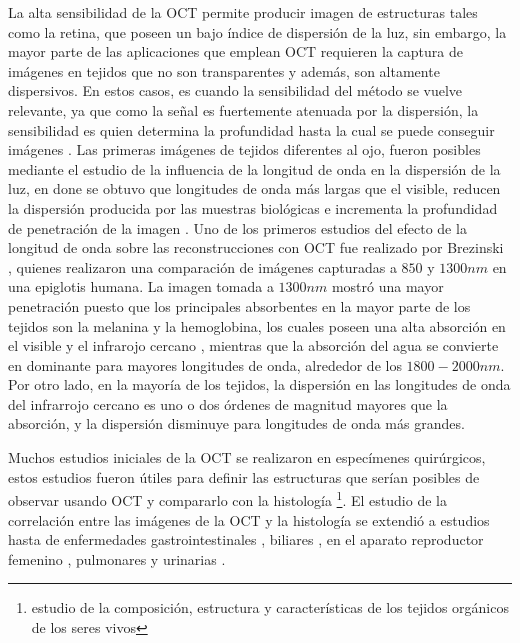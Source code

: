 La alta sensibilidad de la OCT permite producir imagen de estructuras tales como la retina, que poseen un bajo índice de dispersión de la luz, sin embargo, la mayor parte de las aplicaciones que emplean OCT requieren la captura de imágenes en tejidos que no son transparentes y además, son altamente dispersivos. En estos casos, es cuando la sensibilidad del método se vuelve relevante, ya que como la señal es fuertemente atenuada por la dispersión, la sensibilidad es quien determina la profundidad hasta la cual se puede conseguir imágenes \cite{Drexler2015}. Las primeras imágenes de tejidos diferentes al ojo, fueron posibles mediante el estudio de la influencia de la longitud de onda en la dispersión de la luz, en done se obtuvo que longitudes de onda más largas que el visible, reducen la dispersión producida por las muestras biológicas e incrementa la profundidad de penetración de la imagen \cite{Brezinski1996, Schuman1995}. Uno de los primeros estudios del efecto de la longitud de onda sobre las reconstrucciones con OCT fue realizado por Brezinski \etal \cite{Brezinski1996}, quienes realizaron una comparación de imágenes capturadas a $850$ y $1300nm$ \exvivo en una epiglotis humana. La imagen tomada a $1300nm$ mostró una mayor penetración puesto que los principales absorbentes en la mayor parte de los tejidos son la melanina y la hemoglobina, los cuales poseen una alta absorción en el visible y el infrarojo cercano \cite{Parsa1989}, mientras que la absorción del agua se convierte en dominante para mayores longitudes de onda, alrededor de los $1800-2000nm$. Por otro lado, en la mayoría de los tejidos, la dispersión en las longitudes de onda del infrarrojo cercano es uno o dos órdenes de magnitud mayores que la absorción, y la dispersión disminuye para longitudes de onda más grandes.


Muchos estudios iniciales de la OCT se realizaron \exvivo en especímenes quirúrgicos, estos estudios fueron útiles para definir las estructuras que serían posibles de observar usando OCT \cite{Brezinski1996} y compararlo con la histología \footnote{estudio de la composición, estructura y características de los tejidos orgánicos de los seres vivos}. El estudio de la correlación entre las imágenes \exvivo de la  OCT y la histología se extendió a estudios hasta de enfermedades gastrointestinales \cite{Izatt1996, Tearney1997, Kobayashi1998, Pitris2000}, biliares \cite{Tearney1998}, en el aparato reproductor femenino \cite{Pitris1999}, pulmonares \cite{Pitris1998} y urinarias \cite{Tearney1997}.


